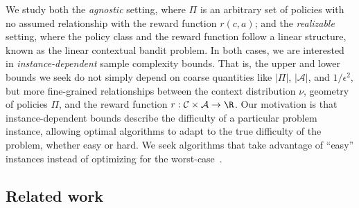 \documentclass{article}
\newcommand{\mc}[1]{\mathcal{#1}}
\newcommand{\1}{\mathbf{1}}
\renewcommand{\v}{r} %
\begin{document}

We study both the \emph{agnostic} setting,  where $\Pi$ is an arbitrary set of policies with no assumed relationship with the reward function $\v(c,a)$; and the \emph{realizable} setting, where the policy class and the reward function follow a linear structure, known as the linear contextual bandit problem. 
In both cases, we are interested in \emph{instance-dependent} sample complexity bounds.
That is, the upper and lower bounds we seek do not simply depend on coarse quantities like $|\Pi|$, $|\mc{A}|$, and $1/\epsilon^2$,  but more fine-grained relationships between the context distribution $\nu$, geometry of policies $\Pi$, and the reward function $\v:\mc{C} \times \mc{A} \rightarrow \R$.
Our motivation is that instance-dependent bounds describe the difficulty of a particular problem instance, allowing optimal algorithms to adapt to the true difficulty of the problem, whether easy or hard.
We seek algorithms that take advantage of ``easy'' instances instead of optimizing for the worst-case~\cite{LogisticBound}.


\subsection{Related work}
\end{document}
